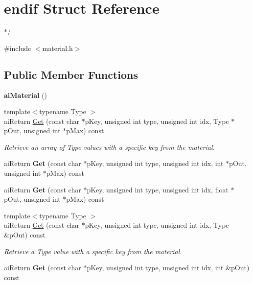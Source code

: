 \hypertarget{structendif}{\section{endif Struct Reference}
\label{structendif}
}


$\ast$/  




{\ttfamily \#include $<$material.\-h$>$}

\subsection*{Public Member Functions}
\begin{DoxyCompactItemize}
\item 
\hypertarget{structendif_aecfb322023b3a31eb28c53ddb5fe5cb3}{{\bfseries ai\-Material} ()}\label{structendif_aecfb322023b3a31eb28c53ddb5fe5cb3}

\item 
{\footnotesize template$<$typename Type $>$ }\\ai\-Return \hyperlink{structendif_a4b08154b44a2676d0664547b6475aa0b}{Get} (const char $\ast$p\-Key, unsigned int type, unsigned int idx, Type $\ast$p\-Out, unsigned int $\ast$p\-Max) const 
\begin{DoxyCompactList}\small\item\em Retrieve an array of Type values with a specific key from the material. \end{DoxyCompactList}\item 
\hypertarget{structendif_a5f7f7f17939445e46d4b627a94e6f3e8}{ai\-Return {\bfseries Get} (const char $\ast$p\-Key, unsigned int type, unsigned int idx, int $\ast$p\-Out, unsigned int $\ast$p\-Max) const }\label{structendif_a5f7f7f17939445e46d4b627a94e6f3e8}

\item 
\hypertarget{structendif_a3025cbc4b9b9ab1a2d576226c88b9580}{ai\-Return {\bfseries Get} (const char $\ast$p\-Key, unsigned int type, unsigned int idx, float $\ast$p\-Out, unsigned int $\ast$p\-Max) const }\label{structendif_a3025cbc4b9b9ab1a2d576226c88b9580}

\item 
{\footnotesize template$<$typename Type $>$ }\\ai\-Return \hyperlink{structendif_aaa5e921648171c5d4a9f195030c17883}{Get} (const char $\ast$p\-Key, unsigned int type, unsigned int idx, Type \&p\-Out) const 
\begin{DoxyCompactList}\small\item\em Retrieve a Type value with a specific key from the material. \end{DoxyCompactList}\item 
\hypertarget{structendif_a178f108e6bd7afef988a043e70f29cdf}{ai\-Return {\bfseries Get} (const char $\ast$p\-Key, unsigned int type, unsigned int idx, int \&p\-Out) const }\label{structendif_a178f108e6bd7afef988a043e70f29cdf}


\end{DoxyCompactItemize}
